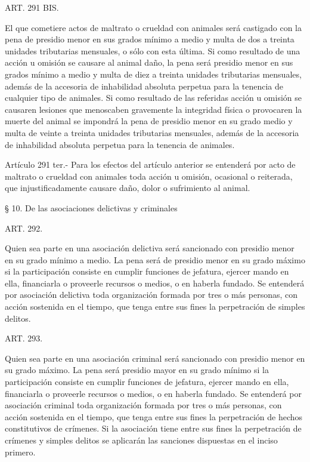     ART. 291 BIS.

    El que cometiere actos de maltrato o crueldad con animales será castigado con la pena de presidio menor en sus grados mínimo a medio y multa de dos a treinta unidades tributarias mensuales, o sólo con esta última.
    Si como resultado de una acción u omisión se causare al animal daño, la pena será presidio menor en sus grados mínimo a medio y multa de diez a treinta unidades tributarias mensuales, además de la accesoria de inhabilidad absoluta perpetua para la tenencia de cualquier tipo de animales.
    Si como resultado de las referidas acción u omisión se causaren lesiones que menoscaben gravemente la integridad física o provocaren la muerte del animal se impondrá la pena de presidio menor en su grado medio y multa de veinte a treinta unidades tributarias mensuales, además de la accesoria de inhabilidad absoluta perpetua para la tenencia de animales.



    Artículo 291 ter.- Para los efectos del artículo anterior se entenderá por acto de maltrato o crueldad con animales toda acción u omisión, ocasional o reiterada, que injustificadamente causare daño, dolor o sufrimiento al animal.


    § 10. De las asociaciones delictivas y criminales



    ART. 292.

    Quien sea parte en una asociación delictiva será sancionado con presidio menor en su grado mínimo a medio.
    La pena será de presidio menor en su grado máximo si la participación consiste en cumplir funciones de jefatura, ejercer mando en ella, financiarla o proveerle recursos o medios, o en haberla fundado.
    Se entenderá por asociación delictiva toda organización formada por tres o más personas, con acción sostenida en el tiempo, que tenga entre sus fines la perpetración de simples delitos.


    ART. 293.

    Quien sea parte en una asociación criminal será sancionado con presidio menor en su grado máximo.
    La pena será presidio mayor en su grado mínimo si la participación consiste en cumplir funciones de jefatura, ejercer mando en ella, financiarla o proveerle recursos o medios, o en haberla fundado.
    Se entenderá por asociación criminal toda organización formada por tres o más personas, con acción sostenida en el tiempo, que tenga entre sus fines la perpetración de hechos constitutivos de crímenes.
    Si la asociación tiene entre sus fines la perpetración de crímenes y simples delitos se aplicarán las sanciones dispuestas en el inciso primero.


